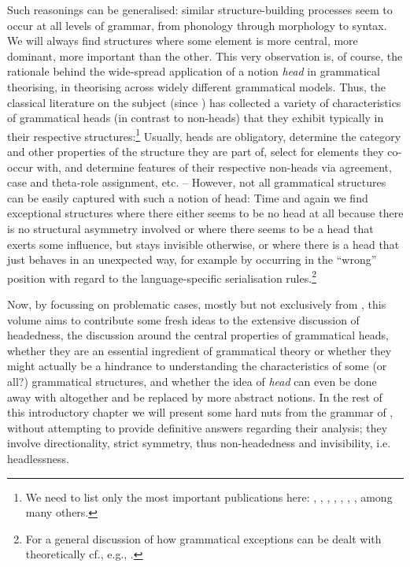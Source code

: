 \documentclass[output=paper
  ,nobabel
  ,draftmode
  ,colorlinks, citecolor=brown
]{langscibook}
\begin{document}
Such reasonings can be generalised: similar structure-building processes seem to occur at all levels
of grammar, from phonology through morphology to syntax. We will always find structures where some
element is more central, more dominant, more important than the other. This very observation is, of
course, the rationale behind the wide-spread application of a notion \emph{head} in grammatical
theorising, in theorising across widely different grammatical models. Thus, the classical literature
on the subject (since \citealt{Bloomfield1933}) has collected a variety of characteristics of
grammatical heads (in contrast to non-heads) that they exhibit typically in their respective
structures:\footnote{We need to list only the most important publications here: \citet{Lieber1981},
  \citet{Williams1981}, \citet{Selkirk1982}, \citet{Zwicky85a}, \citet{Hudson1987},
  \citet{CorbettEtAl1993}, \citet{Croft1996}, among many others.} Usually, heads are obligatory,
determine the category and other properties of the structure they are part of, select for elements
they co-occur with, and determine features of their respective non-heads via agreement, case and
theta-role assignment, etc. – However, not all grammatical structures can be easily captured with
such a notion of head: Time and again we find exceptional structures where there either seems to be
no head at all because there is no structural asymmetry involved or where there seems to be a head
that exerts some influence, but stays invisible otherwise, or where there is a head that just
behaves in an unexpected way, for example by occurring in the “wrong'' position with regard to the
language-specific serialisation rules.\footnote{For a general discussion of how grammatical
  exceptions can be dealt with theoretically cf., e.g., \citet{SimonWiese2011}.}

Now, by focussing on problematic cases, mostly but not exclusively from , this volume aims to
contribute some fresh ideas to the extensive discussion of headedness, the discussion around the
central properties of grammatical heads, whether they are an essential ingredient of grammatical
theory or whether they might actually be a hindrance to understanding the characteristics of some
(or all?) grammatical structures, and whether the idea of \emph{head} can even be done away with
altogether and be replaced by more abstract notions. In the rest of this introductory chapter we
will present some hard nuts from the grammar of , without attempting to provide definitive
answers regarding their analysis; they involve directionality, strict symmetry, thus non-headedness
and invisibility, i.e. headlessness.
\end{document}
